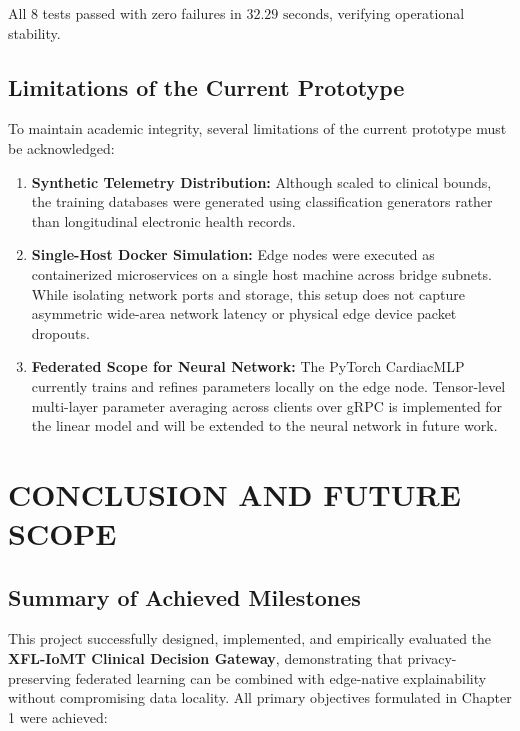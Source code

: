 \documentclass[12pt,a4paper,oneside]{report}
\begin{document}
All 8 tests passed with zero failures in $32.29\text{ seconds}$, verifying operational stability.

\section{Limitations of the Current Prototype}
To maintain academic integrity, several limitations of the current prototype must be acknowledged:
\begin{enumerate}
    \item \textbf{Synthetic Telemetry Distribution:} Although scaled to clinical bounds, the training databases were generated using classification generators rather than longitudinal electronic health records.
    \item \textbf{Single-Host Docker Simulation:} Edge nodes were executed as containerized microservices on a single host machine across bridge subnets. While isolating network ports and storage, this setup does not capture asymmetric wide-area network latency or physical edge device packet dropouts.
    \item \textbf{Federated Scope for Neural Network:} The PyTorch CardiacMLP currently trains and refines parameters locally on the edge node. Tensor-level multi-layer parameter averaging across clients over gRPC is implemented for the linear model and will be extended to the neural network in future work.
\end{enumerate}



\chapter{CONCLUSION AND FUTURE SCOPE}

\section{Summary of Achieved Milestones}
This project successfully designed, implemented, and empirically evaluated the \textbf{XFL-IoMT Clinical Decision Gateway}, demonstrating that privacy-preserving federated learning can be combined with edge-native explainability without compromising data locality. All primary objectives formulated in Chapter 1 were achieved:
\end{document}
